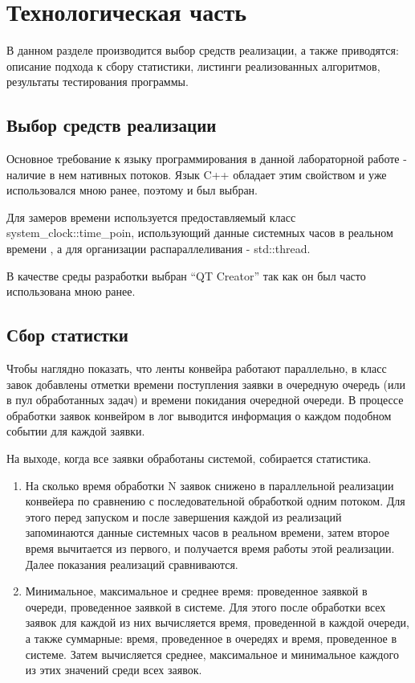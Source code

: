 \chapter{Технологическая часть}

В данном разделе производится выбор средств реализации, а также приводятся: описание подхода к сбору статистики, листинги реализованных алгоритмов, результаты тестирования программы.


\section{Выбор средств реализации}

Основное требование к языку программирования в данной лабораторной работе - наличие в нем нативных потоков. Язык C++ обладает этим свойством \cite{CBook} и уже использовался мною ранее, поэтому и был выбран. 

Для замеров времени используется предоставляемый класс system\_clock::time\_poin, использующий данные системных часов в реальном времени \cite{CBook2}, а для организации распараллеливания -  std::thread.

В качестве среды разработки выбран “QT Creator” так как он был часто использована мною ранее.

\section{Сбор статистки}

Чтобы наглядно показать, что ленты конвейра работают параллельно, в класс завок добавлены отметки времени поступления заявки в очередную очередь (или в пул обработанных задач) и времени покидания очередной очереди. В процессе обработки заявок конвейром в лог выводится информация о каждом подобном событии для каждой заявки.

На выходе, когда все заявки обработаны системой, собирается статистика.
\begin{enumerate}[label={\arabic*)}]
	\item На сколько время обработки N заявок снижено в параллельной реализации конвейера по сравнению с последовательной обработкой одним потоком. Для этого перед запуском и после завершения каждой из реализаций запоминаются данные системных часов в реальном времени, затем второе время вычитается из первого, и получается время работы этой реализации. Далее показания реализаций сравниваются.
	
	\item Минимальное, максимальное и среднее время: проведенное заявкой в очереди, проведенное заявкой в системе. Для этого после обработки всех заявок для каждой из них вычисляется время, проведенной в каждой очереди, а также суммарные: время, проведенное в очередях и время, проведенное в системе. Затем вычисляется среднее, максимальное и минимальное каждого из этих значений среди всех заявок.
\end{enumerate}



